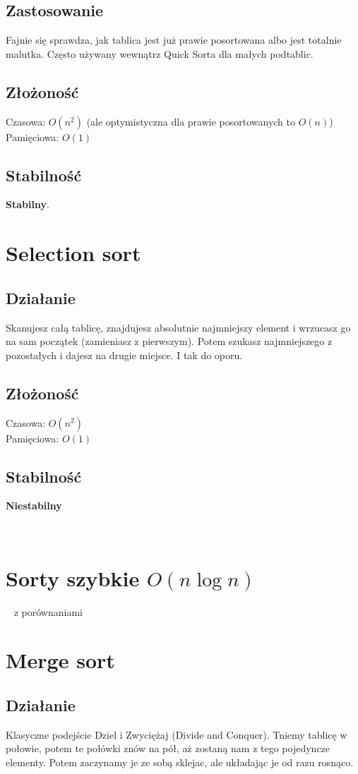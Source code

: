 \documentclass[12pt]{article}
\begin{document}
\subsection{Zastosowanie}
Fajnie się sprawdza, jak tablica jest już prawie posortowana albo jest totalnie malutka. Często używany wewnątrz Quick Sorta dla małych podtablic.
\subsection{Złożoność}
Czasowa: $O(n^2)$ (ale optymistyczna dla prawie posortowanych to $O(n)$) \\
Pamięciowa: $O(1)$
\subsection{Stabilność}
\textbf{Stabilny}.

\section{Selection sort}
\subsection{Działanie}
Skanujesz całą tablicę, znajdujesz absolutnie najmniejszy element i wrzucasz go na sam początek (zamieniasz z pierwszym). Potem szukasz najmniejszego z pozostałych i dajesz na drugie miejsce. I tak do oporu.
\subsection{Złożoność}
Czasowa: $O(n^2)$  \\
Pamięciowa: $O(1)$
\subsection{Stabilność}
\textbf{Niestabilny}
\newpage
\begin{center}
  \section*{Sorty szybkie $O(n \log n)$}
  z porównaniami
\end{center}

\section{Merge sort}
\subsection{Działanie}
Klasyczne podejście Dziel i Zwyciężaj (Divide and Conquer). Tniemy tablicę w połowie, potem te połówki znów na pół, aż zostaną nam z tego pojedyncze elementy. Potem zaczynamy je ze sobą sklejac, ale układając je od razu rosnąco.
\end{document}
